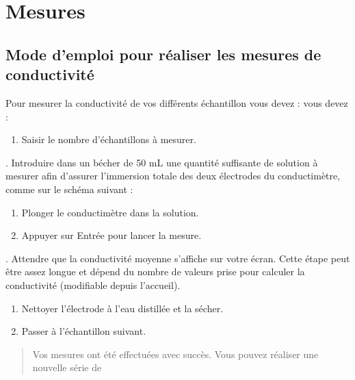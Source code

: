 \documentclass[letterpaper,10pt,french]{sphinxmanual}
\begin{document}
\sphinxstepscope


\chapter{Mesures}
\label{\detokenize{Mesures:mesures}}\label{\detokenize{Mesures::doc}}

\section{Mode d’emploi pour réaliser  les mesures de conductivité}
\label{\detokenize{Mesures:mode-d-emploi-pour-realiser-les-mesures-de-conductivite}}
\sphinxAtStartPar
Pour mesurer la conductivité de vos différents échantillon vous devez :
vous devez :
\begin{enumerate}
%
\item {} 
\sphinxAtStartPar
Saisir le nombre d’échantillons à mesurer.

\end{enumerate}

. Introduire dans un bécher de 50 mL une quantité suffisante de solution à mesurer afin
d’assurer l’immersion totale des deux électrodes du conductimètre, comme sur le schéma
suivant :

\begin{figure}[htbp]
\centering

\noindent{}
\end{figure}
\begin{enumerate}
%
\setcounter{enumi}{2}
\item {} 
\sphinxAtStartPar
Plonger le conductimètre dans la solution.

\item {} 
\sphinxAtStartPar
Appuyer sur Entrée pour lancer la mesure.

\end{enumerate}

. Attendre que la conductivité moyenne s’affiche sur votre écran. Cette étape peut être assez
longue et dépend du nombre de valeurs prise pour calculer la conductivité (modifiable
depuis l’accueil).
\begin{enumerate}
%
\setcounter{enumi}{5}
\item {} 
\sphinxAtStartPar
Nettoyer l’électrode à l’eau distillée et la sécher.

\item {} 
\sphinxAtStartPar
Passer à l’échantillon suivant.

\end{enumerate}
\begin{quote}

\sphinxAtStartPar
Vos mesures ont été effectuées avec succès. Vous pouvez réaliser une nouvelle série de
\end{quote}
\end{document}
